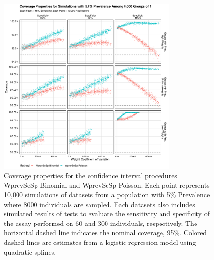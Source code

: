 \documentclass[AMA,STIX1COL]{WileyNJD-v2}
\begin{document}
\begin{figure}
\centering
\includegraphics[width=0.8\textwidth]{figures/imperfect_coverage_8000_groups_0_05_prev.pdf}
\caption{Coverage properties for the confidence interval procedures, WprevSeSp Binomial and WprevSeSp Poisson.
Each point represents 10,000 simulations of datasets from a population with 5\% Prevalence where 8000 individuals are sampled.
Each datasets also includes simulated results of tests to evaluate the sensitivity and specificity of the assay performed on 60 and 300 individuals, respectively.
The horizontal dashed line indicates the nominal coverage, 95\%.
Colored dashed lines are estimates from a logistic regression model using quadratic splines.}
\label{fig:imperfect_coverage_8000_groups_0_05_prev}
\end{figure}
\end{document}
